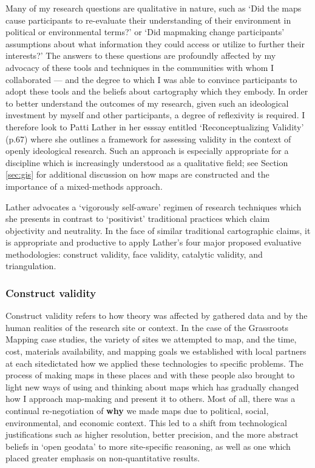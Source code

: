 \documentclass[11pt,oneside,notitlepage]{report}
\begin{document}
Many of my research questions are qualitative in nature, such as `Did the maps cause participants to re-evaluate their understanding of their environment in political or environmental terms?' or `Did mapmaking change participants' assumptions about what information they could access or utilize to further their interests?' The answers to these questions are profoundly affected by my advocacy of these tools and techniques in the communities with whom I collaborated --- and the degree to which I was able to convince participants to adopt these tools and the beliefs about cartography which they embody. In order to better understand the outcomes of my research, given such an ideological investment by myself and other participants, a degree of reflexivity is required. I therefore look to Patti Lather in her esssay entitled `Reconceptualizing Validity' (p.67) where she outlines a framework for assessing validity in the context of openly ideological research. Such an approach is especially appropriate for a discipline which is increasingly understood as a qualitative field; see Section \ref{sec:gis} for additional discussion on how maps are constructed and the importance of a mixed-methods approach. 

Lather advocates a `vigorously self-aware' regimen of research techniques which she presents in contrast to `positivist' traditional practices which claim objectivity and neutrality. In the face of similar traditional cartographic claims, it is appropriate and productive to apply Lather's four major proposed evaluative methodologies: construct validity, face validity, catalytic validity, and triangulation. 

\subsubsection{Construct validity}

Construct validity refers to how theory was affected by gathered data and by the human realities of the research site or context. In the case of the Grassroots Mapping case studies, the variety of sites we attempted to map, and the time, cost, materials availability, and mapping goals we established with local partners at each sitedictated how we applied these technologies to specific problems. The process of making maps in these places and with these people also brought to light new ways of using and thinking about maps which has gradually changed how I approach map-making and present it to others. Most of all, there was a continual re-negotiation of \textbf{why} we made maps due to political, social, environmental, and economic context. This led to a shift from technological justifications such as higher resolution, better precision, and the more abstract beliefs in `open geodata' to more site-specific reasoning, as well as one which placed greater emphasis on non-quantitative results.  
\end{document}
